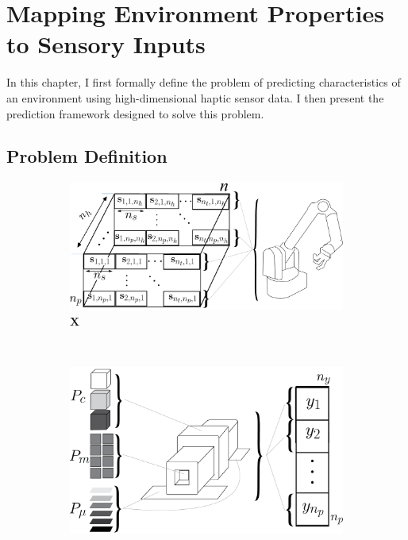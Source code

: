 \chapter{Mapping Environment Properties to Sensory Inputs}
\label{chap3}

In this chapter, I first formally define the problem of predicting characteristics of an environment using high-dimensional haptic sensor data. 
I then present the prediction framework designed to solve this problem.

\section{Problem Definition}

\begin{figure}[h]
  \begin{subfigure}[t]{0.52\linewidth}
    \includegraphics[width=\linewidth]{images/X_defn}  %
    \caption{$\mathbf{X}$}
    \label{fig:X_defn}
  \end{subfigure}
  ~~
  \begin{subfigure}[t]{0.43\linewidth}
    \includegraphics[width=\linewidth]{images/Y_defn}  %

\end{subfigure}
\end{figure}
